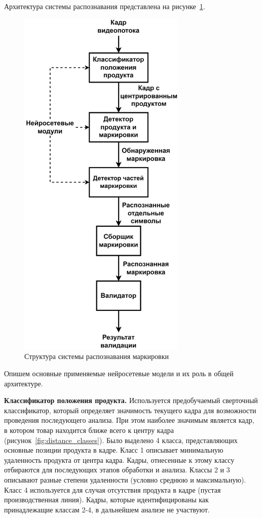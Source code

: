 Архитектура системы распознавания представлена на рисунке~\ref{fig:structure}.

\begin{figure}[!ht]
	\centering
	\includegraphics[width=8cm]{man-source/images/ch4/savushkin_structure.png}
	\caption{Структура системы распознавания маркировки}
	\label{fig:structure}
\end{figure}

Опишем основные применяемые нейросетевые модели и их роль в общей архитектуре.

\textbf{Классификатор положения продукта.} Используется предобучаемый сверточный классификатор, который определяет значимость текущего кадра для возможности проведения последующего анализа. При этом наиболее значимым является кадр, в котором товар находится ближе всего к центру кадра (рисунок~\ref{fig:distance_classes}). Было выделено 4 класса, представляющих основные позиции продукта в кадре. Класс 1 описывает минимальную удаленность продукта от центра кадра. Кадры, отнесенные к этому классу отбираются для последующих этапов обработки и анализа. Классы 2 и 3 описывают разные степени удаленности (условно среднюю и максимальную). Класс 4 используется для случая отсутствия продукта в кадре (пустая производственная линия).
Кадры, которые идентифицированы как принадлежащие классам 2-4, в дальнейшем анализе не участвуют. 

